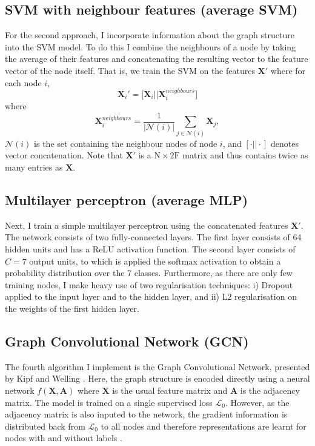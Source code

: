 \documentclass[12pt]{article}
\theoremstyle{definition}
\begin{document}
\subsection{SVM with neighbour features (average SVM)}
\label{section/average_svm}
For the second approach, I incorporate information about the graph structure into the SVM model. To do this I combine the neighbours of a node by taking the average of their features and concatenating the resulting vector to the feature vector of the node itself. That is, we train the SVM on the features $\mathbf{X}'$ where for each node $i$,
\[
	\mathbf{X}_i' = \big[\mathbf{X}_i \big\vert \big\vert \mathbf{X}^{\mathit{neighbours}}_i \big]
\]
where
\[
	\mathbf{X}^{\mathit{neighbours}}_i  = \frac{1}{\left\vert \mathcal{N}(i) \right\vert} \sum_{j \in \mathcal{N}(i)} \mathbf{X}_j,
\]
$\mathcal{N}(i)$ is the set containing the neighbour nodes of node $i$, and $[\cdot \vert\vert \cdot ]$ denotes vector concatenation. Note that $\mathbf{X}'$ is a $\textrm{N} \times 2 \textrm{F}$ matrix and thus contains twice as many entries as $\mathbf{X}$.

\subsection{Multilayer perceptron (average MLP)}
Next, I train a simple multilayer perceptron using the concatenated features $\mathbf{X}'$. The network consists of two fully-connected layers. The first layer consists of 64 hidden units and has a ReLU activation function. The second layer consists of $C=7$ output units, to which is applied the softmax activation to obtain a probability distribution over the 7 classes. Furthermore, as there are only few training nodes, I make heavy use of two regularisation techniques: i) Dropout \cite{srivastava2014dropout} applied to the input layer and to the hidden layer, and ii) L2 regularisation on the weights of the first hidden layer.

\subsection{Graph Convolutional Network (GCN)}
The fourth algorithm I implement is the Graph Convolutional Network, presented by Kipf and Welling \cite{kipf2017semi}. Here, the graph structure is encoded directly using a neural network $f(\mathbf{X}, \mathbf{A})$ where $\mathbf{X}$ is the usual feature matrix and $\mathbf{A}$ is the adjacency matrix. The model is trained on a single supervised loss $\mathcal{L}_0$. However, as the adjacency matrix is also inputed to the network, the gradient information is distributed back from $\mathcal{L}_0$ to all nodes and therefore representations are learnt for nodes with and without labels \cite{kipf2017semi}.
\end{document}
